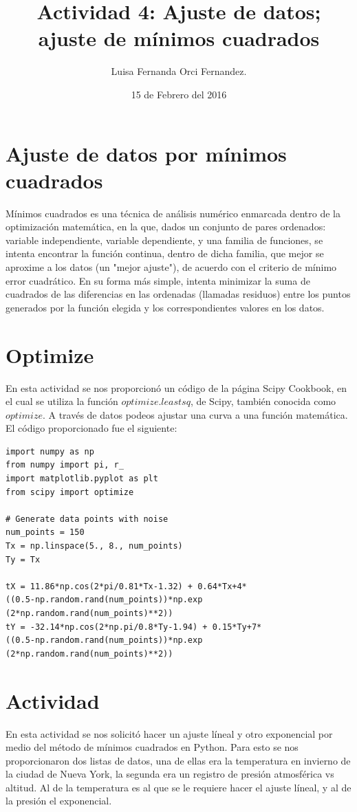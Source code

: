 \documentclass[12pt,letterpaper]{article}
\begin{document}
\title{Actividad 4: Ajuste de datos; ajuste de mínimos cuadrados}
\author{Luisa Fernanda Orci Fernandez.}
\date{15 de Febrero del 2016}

\maketitle

\section*{Ajuste de datos por mínimos cuadrados}
Mínimos cuadrados es una técnica de análisis numérico enmarcada dentro de la optimización matemática, en la que, dados un conjunto de pares ordenados: variable independiente, variable dependiente, y una familia de funciones, se intenta encontrar la función continua, dentro de dicha familia, que mejor se aproxime a los datos (un "mejor ajuste"), de acuerdo con el criterio de mínimo error cuadrático. En su forma más simple, intenta minimizar la suma de cuadrados de las diferencias en las ordenadas (llamadas residuos) entre los puntos generados por la función elegida y los correspondientes valores en los datos.  \cite{w}

\section{Optimize}
En esta actividad se nos proporcionó un código de la página Scipy Cookbook, en el cual se utiliza la función $optimize.leastsq$, de Scipy, también conocida como $optimize$. A través de datos podeos ajustar una curva a una función matemática. \\

El código proporcionado fue el siguiente:
\begin{verbatim}
import numpy as np
from numpy import pi, r_
import matplotlib.pyplot as plt
from scipy import optimize

# Generate data points with noise
num_points = 150
Tx = np.linspace(5., 8., num_points)
Ty = Tx

tX = 11.86*np.cos(2*pi/0.81*Tx-1.32) + 0.64*Tx+4*
((0.5-np.random.rand(num_points))*np.exp
(2*np.random.rand(num_points)**2))
tY = -32.14*np.cos(2*np.pi/0.8*Ty-1.94) + 0.15*Ty+7*
((0.5-np.random.rand(num_points))*np.exp
(2*np.random.rand(num_points)**2))
\end{verbatim}

\section{Actividad}
En esta actividad se nos solicitó hacer un ajuste líneal y otro exponencial por medio del método de mínimos cuadrados en Python. Para esto se nos proporcionaron dos listas de datos, una de ellas era la temperatura en invierno de la ciudad de Nueva York, la segunda era un registro de presión atmosférica vs altitud. Al de la temperatura es al que se le requiere hacer el ajuste líneal, y al de la presión el exponencial.
\end{document}
